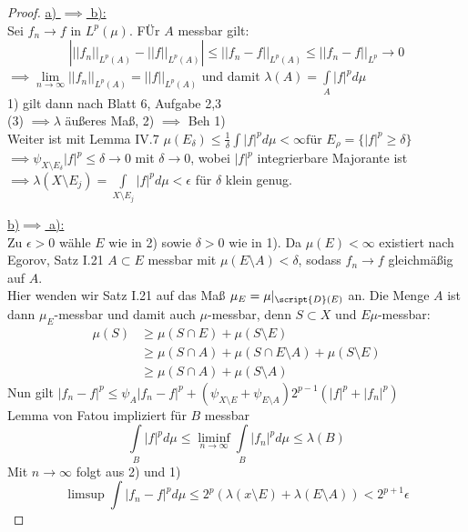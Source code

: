   \begin{proof}
    \item[] \underline{a) $\implies$ b):} \\
    Sei $f_n \to f$ in $L^p(\mu)$. FÜr $A$ messbar gilt: 
    $$ \left| ||f_n||_{L^p(A)} - ||f||_{L^p(A)} \right| \leq ||f_n-f||_{L^p(A)} \leq ||f_n-f||_{L^p} \to 0$$ 
    $\implies \lim\limits_{n\to\infty} ||f_n||_{L^p(A)} = ||f||_{L^p(A)}$ und damit $\lambda(A) = \int\limits_{A}|f|^p d\mu$ \\
    1) gilt dann nach Blatt 6, Aufgabe 2,3 \\
    (3) $\implies \lambda$ äußeres Maß, 2) $\implies$ Beh 1) \\
    Weiter ist mit Lemma IV.7 $\mu(E_\delta) \leq \frac{1}{\delta}\int |f|^p d\mu < \infty \text{für } E_\rho = \{ |f|^p \geq \delta \} $ \\
    $\implies \psi_{X\setminus E_\delta} |f|^p \leq \delta \to 0$ mit $\delta \to 0$, wobei $|f|^p$ integrierbare Majorante ist $\implies \lambda(X\setminus E_j) = \int\limits_{X\setminus E_j} |f|^p d\mu < \epsilon$ für $\delta$ klein genug. 
    \item[]\underline{b)$\implies$ a):}\\
    Zu $\epsilon > 0$ wähle $E$ wie in 2) sowie $\delta >0$ wie in 1). Da $\mu(E) < \infty$ existiert nach Egorov, Satz I.21 $A\subset E$ messbar mit $\mu(E\setminus A) < \delta$, sodass $f_n \to f$ gleichmäßig auf $A$. \\
    Hier wenden wir Satz I.21 auf das Maß $\mu_E = \mu|_{\script{D}(E)}$ an. 
	Die Menge $A$ ist dann $\mu_E$-messbar und damit auch $\mu$-messbar, denn $S \subset X$ und $E \mu$-messbar: 
	\begin{equation*}
	 \begin{split} \mu(S) &\geq \mu(S\cap E) + \mu(S\setminus E) \\
	 &\geq \mu(S\cap A) + \mu (S\cap E \setminus A) + \mu(S\setminus E) \\
	 &\geq \mu(S\cap A) + \mu(S\setminus A)
	 \end{split}
	\end{equation*}
	Nun gilt $|f_n -f|^p \leq \psi_A |f_n-f|^p + (\psi_{X\setminus E}+\psi_{E\setminus A}) 2^{p-1}(|f|^p+|f_n|^p)$ \\
	Lemma von Fatou impliziert für $B$ messbar $$\int\limits_B |f|^p d\mu \leq \liminf\limits_{n\to\infty} \int\limits_B |f_n|^p d\mu \leq \lambda(B)$$
	Mit $n\to\infty$ folgt aus 2) und 1) $$\limsup \int |f_n-f|^p d\mu \leq 2^p (\lambda(x\setminus E)+\lambda (E\setminus A)) < 2^{p+1}\epsilon$$
  \end{proof}

  